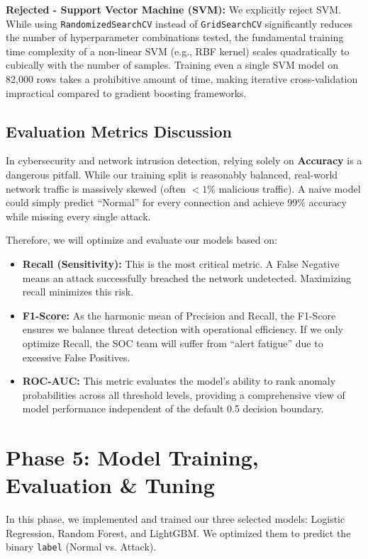 \documentclass[12pt, a4paper]{article}
\begin{document}
\textbf{Rejected - Support Vector Machine (SVM):} 
We explicitly reject SVM. While using \texttt{RandomizedSearchCV} instead of \texttt{GridSearchCV} significantly reduces the number of hyperparameter combinations tested, the fundamental training time complexity of a non-linear SVM (e.g., RBF kernel) scales quadratically to cubically with the number of samples. Training even a single SVM model on 82,000 rows takes a prohibitive amount of time, making iterative cross-validation impractical compared to gradient boosting frameworks.

\subsection{Evaluation Metrics Discussion}
In cybersecurity and network intrusion detection, relying solely on \textbf{Accuracy} is a dangerous pitfall. While our training split is reasonably balanced, real-world network traffic is massively skewed (often $<1\%$ malicious traffic). A naive model could simply predict ``Normal'' for every connection and achieve 99\% accuracy while missing every single attack.

Therefore, we will optimize and evaluate our models based on:
\begin{itemize}
    \item \textbf{Recall (Sensitivity):} This is the most critical metric. A False Negative means an attack successfully breached the network undetected. Maximizing recall minimizes this risk.
    \item \textbf{F1-Score:} As the harmonic mean of Precision and Recall, the F1-Score ensures we balance threat detection with operational efficiency. If we only optimize Recall, the SOC team will suffer from ``alert fatigue'' due to excessive False Positives.
    \item \textbf{ROC-AUC:} This metric evaluates the model's ability to rank anomaly probabilities across all threshold levels, providing a comprehensive view of model performance independent of the default 0.5 decision boundary.
\end{itemize}

\section{Phase 5: Model Training, Evaluation \& Tuning}

In this phase, we implemented and trained our three selected models: Logistic Regression, Random Forest, and LightGBM. We optimized them to predict the binary \texttt{label} (Normal vs. Attack).
\end{document}
